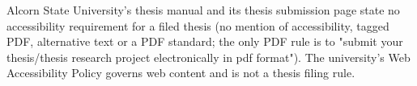 %





	{Alcorn State University's thesis manual and its thesis submission page
	 state no accessibility requirement for a filed thesis (no mention of
	 accessibility, tagged PDF, alternative text or a PDF standard; the only PDF
	 rule is to "submit your thesis/thesis research project electronically in
	 pdf format"). The university's Web Accessibility Policy governs web
	 content and is not a thesis filing rule.}

